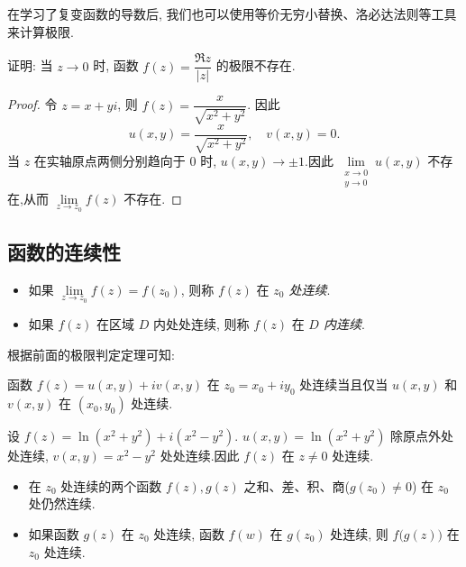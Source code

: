 在学习了复变函数的导数后, 我们也可以使用等价无穷小替换、洛必达法则等工具来计算极限.

\begin{example}
  证明: 当 $z\to0$ 时, 函数 $f(z)=\dfrac{\Re z}{|z|}$ 的极限不存在.
\end{example}

\begin{proof}
  令 $z=x+yi$, 则 $f(z)=\dfrac x{\sqrt{x^2+y^2}}$.
  因此
    \[u(x,y)=\frac x{\sqrt{x^2+y^2}},\quad v(x,y)=0.\]
  当 $z$ 在实轴原点两侧分别趋向于 $0$ 时, $u(x,y)\to\pm1$.因此 $\lim\limits_{\substack{x\to 0\\y\to0}}u(x,y)$ 不存在,从而 $\lim\limits_{z\to z_0}f(z)$ 不存在.
\end{proof}


\subsection{函数的连续性}

\begin{definition}[连续]
  \begin{itemize}
    \item 如果 $\lim\limits_{z\to z_0}f(z)=f(z_0)$, 则称 $f(z)$ 在 \emph{$z_0$ 处连续}.
    \item 如果 $f(z)$ 在区域 $D$ 内处处连续, 则称 $f(z)$ 在 \emph{$D$ 内连续}.
  \end{itemize}
\end{definition}

根据前面的极限判定定理可知:
\begin{theorem}[连续的等价刻画]
  函数 $f(z)=u(x,y)+iv(x,y)$ 在 $z_0=x_0+iy_0$ 处连续当且仅当 $u(x,y)$ 和 $v(x,y)$ 在 $(x_0,y_0)$ 处连续.
\end{theorem}

\begin{example}
  设 $f(z)=\ln(x^2+y^2)+i(x^2-y^2)$.
  $u(x,y)=\ln(x^2+y^2)$ 除原点外处处连续, $v(x,y)=x^2-y^2$ 处处连续.因此 $f(z)$ 在 $z\neq0$ 处连续.
\end{example}

\begin{theorem}[连续函数的四则运算和复合]
  \begin{itemize}
    \item 在 $z_0$ 处连续的两个函数 $f(z),g(z)$ 之和、差、积、商($g(z_0)\neq 0$) 在 $z_0$ 处仍然连续.
    \item 如果函数 $g(z)$ 在 $z_0$ 处连续, 函数 $f(w)$ 在 $g(z_0)$ 处连续, 则 $f\bigl(g(z)\bigr)$ 在 $z_0$ 处连续.
  \end{itemize}
\end{theorem}

